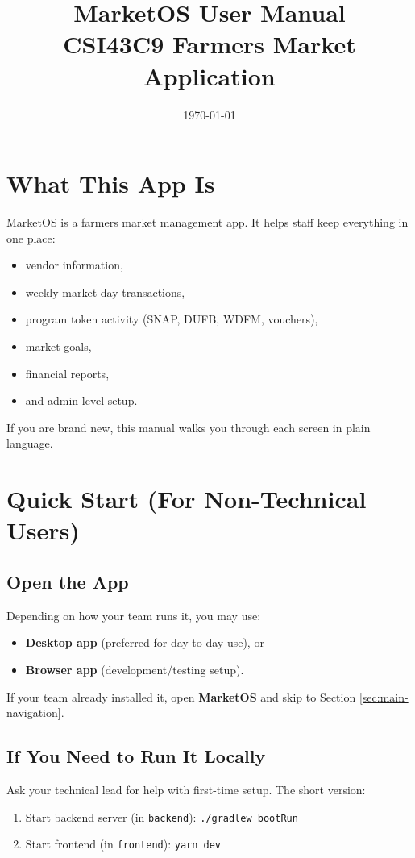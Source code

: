 \documentclass[11pt]{article}
\title{MarketOS User Manual\\\large CSI43C9 Farmers Market Application}
\author{}
\date{\today}
\begin{document}
\maketitle
\tableofcontents
\newpage

\section{What This App Is}
MarketOS is a farmers market management app. It helps staff keep everything in one place:
\begin{itemize}
  \item vendor information,
  \item weekly market-day transactions,
  \item program token activity (SNAP, DUFB, WDFM, vouchers),
  \item market goals,
  \item financial reports,
  \item and admin-level setup.
\end{itemize}

If you are brand new, this manual walks you through each screen in plain language.

\section{Quick Start (For Non-Technical Users)}
\subsection{Open the App}
Depending on how your team runs it, you may use:
\begin{itemize}
  \item \textbf{Desktop app} (preferred for day-to-day use), or
  \item \textbf{Browser app} (development/testing setup).
\end{itemize}

If your team already installed it, open \textbf{MarketOS} and skip to Section \ref{sec:main-navigation}.

\subsection{If You Need to Run It Locally}
Ask your technical lead for help with first-time setup. The short version:
\begin{enumerate}
  \item Start backend server (in \texttt{backend}): \texttt{./gradlew bootRun}
  \item Start frontend (in \texttt{frontend}): \texttt{yarn dev}
\end{enumerate}
\end{document}
